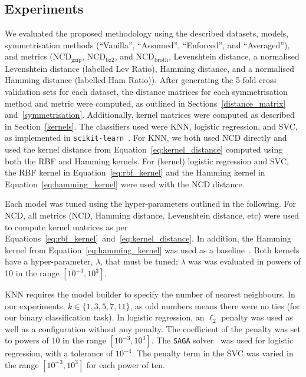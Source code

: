 \documentclass[preprint,12pt]{article}
\begin{document}
\subsection{Experiments}
\label{experiments}

We evaluated the proposed methodology using the described datasets, models, symmetrisation methods (``Vanilla'', ``Assumed'', ``Enforced'', and ``Averaged''), and metrics ($\text{NCD}_{\text{gzip}}$, $\text{NCD}_{\text{bz2}}$, and $\text{NCD}_{\text{brotli}}$, Levenshtein distance, a normalised Levenshtein distance (labelled Lev Ratio),  Hamming distance, and a normalised Hamming distance (labelled Ham Ratio)).
After generating the 5-fold cross validation sets for each dataset, the distance matrices for each symmetrisation method and metric were computed, as outlined in Sections~\ref{distance_matrix} and~\ref{symmetrisation}.
Additionally, kernel matrices were computed as described in Section~\ref{kernels}.
The classifiers used were KNN, logistic regression, and SVC, as implemented in \texttt{scikit-learn}~\cite{sklearn}.
For KNN, we both used NCD directly and used the kernel distance from Equation~\ref{eq:kernel_distance} computed using both the RBF and Hamming kernels. 
For (kernel) logistic regression and SVC, the RBF kernel in Equation~\ref{eq:rbf_kernel} and the Hamming kernel in Equation~\ref{eq:hamming_kernel} were used with the NCD distance. 

Each model was tuned using the hyper-parameters outlined in the following.
For NCD, all metrics (NCD, Hamming distance, Levenshtein distance, etc) were used to compute kernel matrices as per Equations~\ref{eq:rbf_kernel}~and~\ref{eq:kernel_distance}. 
In addition, the Hamming kernel from Equation~\ref{eq:hamming_kernel} was used as a baseline~\cite{hamming_kernel}.
Both kernels have a hyper-parameter, $\lambda$, that must be tuned; $\lambda$ was was evaluated in powers of 10 in the range $[10^{-3}, 10^3]$.

KNN requires the model builder to specify the number of nearest neighbours.
In our experiments, $k \in \{1,3,5,7,11\}$, as odd numbers means there were no ties (for our binary classification task).
In logistic regression, an $\ell_2$ penalty was used as well as a configuration without any penalty.
The coefficient of the penalty was set to powers of 10 in the range $[10^{-3}, 10^3]$.
The \texttt{SAGA} solver~\cite{saga} was used for logistic regression, with a tolerance of $10^{-4}$.
The penalty term in the SVC was varied in the range $[10^{-3}, 10^3]$ for each power of ten.
\end{document}

